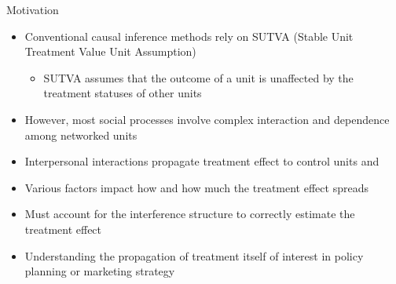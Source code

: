 \documentclass[final]{beamer}
\newlength{\onecolwid}
\newlength{\onecolwidd}
\begin{document}
\begin{frame}[t]
\begin{columns}[t]
\begin{column}{\onecolwidd}
\begin{block}{Motivation}
\begin{rmfamily}
\begin{itemize}
	\item Conventional causal inference methods rely on SUTVA (Stable Unit Treatment Value Unit Assumption)
	\vspace*{.1in}
		\begin{itemize}
		\item SUTVA assumes that the outcome of a unit is unaffected by the treatment statuses of other units
		\end{itemize}
		\vspace*{.1in}	
	\item However, most social processes involve complex interaction and dependence among networked units
	\vspace*{.1in}
	\item Interpersonal interactions propagate treatment effect to control units and
	\vspace*{.1in}
	\item Various factors impact how and how much the treatment effect spreads
	\vspace*{.1in}
	\item Must account for the interference structure to correctly estimate the treatment effect
	\vspace*{.1in}
	\item Understanding the propagation of treatment itself of interest in policy planning or marketing strategy
	
	\end{itemize}



\end{rmfamily}
\end{block}
\end{column}
\end{columns}
\end{frame}
\end{document}
